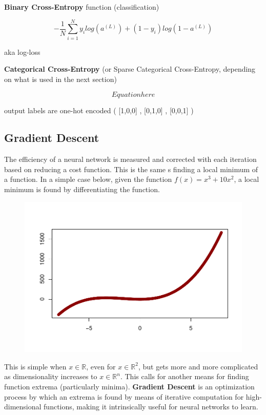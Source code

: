 \textbf{Binary Cross-Entropy} function (classification)

$$
- \frac{1}{N} \sum_{i=1}^N y_i log (a^{(L)}) + (1-y_i) log(1-a^{(L)})
$$

aka log-loss

\textbf{Categorical Cross-Entropy} (or Sparse Categorical Cross-Entropy, depending on what is used in the next section)

$$
Equation here
$$

output labels are one-hot encoded  (
[1,0,0] , [0,1,0] , [0,0,1] )


\hypertarget{gradient-descent}{%
\subsection{Gradient Descent}\label{gradient-descent}}

The efficiency of a neural network is measured and corrected with each
iteration based on reducing a cost function. This is the same s finding
a local minimum of a function. In a simple case below, given the
function \(f(x) = x^3 + 10x^2\), a local minimum is found by
differentiating the function.

\begin{figure}[H]
    \centering
    \includegraphics[width = .7\textwidth]{Figures/grad_desc_2D-1.pdf}
\end{figure}

This is simple when \(x \in \mathbb{R}\), even for
\(x \in \mathbb{R}^2\), but gets more  and more complicated as
dimensionality increases to \(x \in \mathbb{R}^n\). This calls for
another means for finding function extrema (particularly minima).
\textbf{Gradient Descent} is an optimization process by which an extrema is found by
means of iterative computation for high-dimensional functions, making it
intrinsically useful for neural networks to learn.

